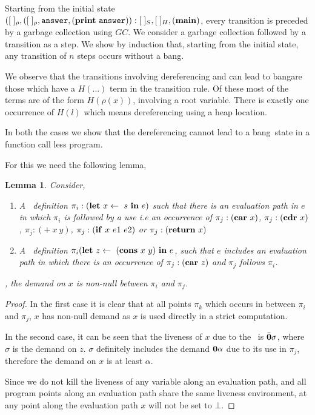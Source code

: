 \documentclass[9pt]{sigplanconf}
\newcommand{\bang}{\mbox{\sc bang}}
\newtheorem{lemma}[theorem]{Lemma}
\begin{document}
Starting   from  the   initial  state   $([\;]_\rho,([\;]_\rho,  \mathbf{\mbox{\tt answer}},
(\mathbf{print}~\mathbf{\mbox{\tt answer}})):[\;]_{S} ,  [\;]_{H}, (\mathbf{main})$, every  transition is
preceded by  a garbage  collection using $GC$.  We consider  a garbage
collection followed  by a transition as  a step. We show  by induction
that, starting  from the  initial state, any  transition of  $n$ steps
occurs without a \bang.

We observe that  the transitions involving dereferencing  and can lead
to \bang are those which have  a $H(...)$ term in the transition rule.
Of these most  of the terms are of the  form $H(\rho(x))$, involving a
root variable.  There is exactly  one occurrence of $H(l)$ which means
dereferencing using a heap location.

In both  the cases  we show  that the dereferencing  cannot lead  to a
\bang\ state in a function call less program.

For this we need the following lemma,
\begin{lemma}
\label{lem:correctness}
Consider, 
\begin{enumerate}
\item
 A \LET\ definition $\pi_i:(\mbox{$\mathbf{ let}$}~x \leftarrow~s~\mbox{$\mathbf{ in}$}~e)$ such
that there is  an evaluation path in $e$ in  which $\pi_i$ is followed
by a  use i.e an  occurrence of $\pi_j:(\mbox{$\mathbf{car}$}\ x)$,  $\pi_j:(\mbox{$\mathbf{cdr}$}\ x)$,
$\pi_j:(+\ x\ y)$, $\pi_j:(\mbox{$\mathbf{ if}$}\ x\ e1\ e2)$ or $\pi_j:(\mbox{$\mathbf{ return}$}\ x)$
\item
 A \LET\ definition $\pi_i(\mbox{$\mathbf{ let}$}~z  \leftarrow~(\mbox{$\mathbf{cons}$}~x~y)~\mbox{$\mathbf{ in}$}~e$, such that
 $e$ includes  an evaluation path in  which there is an  occurrence of
 $\pi_j: (\mbox{$\mathbf{car}$}~z)$ and $\pi_j$ follows $\pi_i$.
\end{enumerate},
the demand on $x$ is non-null between $\pi_i$ and $\pi_j$.
\end{lemma} 
\begin{proof}
In the first case it is clear  that at all points $\pi_k$ which occurs
in between $\pi_i$ and $\pi_j$, $x$  has non-null demand as $x$ is used
directly in a strict computation.

In the second case, it can be seen that the liveness of $x$ due to the
\CONS\ is $\bar{\mathbf{0}}\sigma$, where $\sigma$ is the demand on $z$. $\sigma$
definitely  includes  the  demand  $\mathbf{0}\alpha$ due  to  its  use  in
$\pi_j$, therefore the demand on $x$ is at least $\alpha$. 

 Since we do not kill the liveness of any variable along an evaluation
 path, and all program points along  an evaluation path share the same
 liveness environment, at any point along the evaluation path $x$ will
 not be set to $\bot$.
\end{proof}
\end{document}
